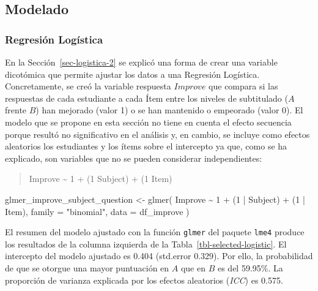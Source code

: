 \documentclass[
  12pt,
  a4paper,
  extrafontsizes,
  onecolumn,
  openright,
  table]{memoir}
\newenvironment{Shaded}{\begin{snugshade}}{\end{snugshade}}
\newcommand{\AttributeTok}[1]{\textcolor[rgb]{0.40,0.45,0.13}{#1}}
\newcommand{\DecValTok}[1]{\textcolor[rgb]{0.68,0.00,0.00}{#1}}
\newcommand{\FunctionTok}[1]{\textcolor[rgb]{0.28,0.35,0.67}{#1}}
\newcommand{\NormalTok}[1]{\textcolor[rgb]{0.00,0.23,0.31}{#1}}
\newcommand{\OtherTok}[1]{\textcolor[rgb]{0.00,0.23,0.31}{#1}}
\newcommand{\SpecialCharTok}[1]{\textcolor[rgb]{0.37,0.37,0.37}{#1}}
\newcommand{\StringTok}[1]{\textcolor[rgb]{0.13,0.47,0.30}{#1}}
\begin{document}
\hypertarget{modelado}{%
\subsection{Modelado}\label{modelado}}

\hypertarget{sec-logistica-3}{%
\subsubsection{Regresión Logística}\label{sec-logistica-3}}

En la Sección~\ref{sec-logistica-2} se explicó una forma de crear una
variable dicotómica que permite ajustar los datos a una Regresión
Logística. Concretamente, se creó la variable respuesta \(Improve\) que
compara si las respuestas de cada estudiante a cada Ítem entre los
niveles de subtitulado (\(A\) frente \(B\)) han mejorado (valor 1) o se
han mantenido o empeorado (valor 0). El modelo que se propone en esta
sección no tiene en cuenta el \gls{efecto secuencia} porque resultó no
significativo en el análisis y, en cambio, se incluye como efectos
aleatorios los estudiantes y los ítems sobre el intercepto ya que, como
se ha explicado, son variables que no se pueden considerar
independientes:

\begin{quote}
Improve \textasciitilde{} 1 + (1 \textbar{} Subject) + (1 \textbar{}
Item)
\end{quote}

\scriptsize

\begin{Shaded}
\begin{Highlighting}[]
\NormalTok{glmer\_improve\_subject\_question }\OtherTok{\textless{}{-}} \FunctionTok{glmer}\NormalTok{(}
\NormalTok{    Improve }\SpecialCharTok{\textasciitilde{}} \DecValTok{1} \SpecialCharTok{+}\NormalTok{ (}\DecValTok{1} \SpecialCharTok{|}\NormalTok{ Subject) }\SpecialCharTok{+}\NormalTok{ (}\DecValTok{1} \SpecialCharTok{|}\NormalTok{ Item),}
    \AttributeTok{family =} \StringTok{"binomial"}\NormalTok{, }\AttributeTok{data =}\NormalTok{ df\_improve}
\NormalTok{)}
\end{Highlighting}
\end{Shaded}

\normalsize

El resumen del modelo ajustado con la función \texttt{glmer} del paquete
\texttt{lme4} \autocite[ver][]{lme4} produce los resultados de la
columna izquierda de la Tabla~\ref{tbl-selected-logistic}. El intercepto
del modelo ajustado es 0.404 (std.error 0.329). Por ello, la
probabilidad de que se otorgue una mayor puntuación en \(A\) que en
\(B\) es del 59.95\%. La proporción de varianza explicada por los
efectos aleatorios (\emph{\gls{ICC}}) es 0.575.
\end{document}
